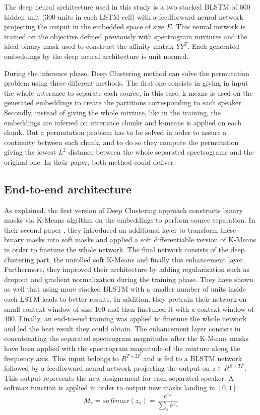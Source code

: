 \documentclass[master,final,11pt]{iscs-thesis}
\begin{document}
The deep neural architecture used in this study is a two stacked BLSTM of 600 hidden unit (300 units in each LSTM cell) with a feedforward neural network projecting the output in the embedded space of size $E$. This neural network is trained on the objective defined previously with spectrogram mixtures and the ideal binary mask used to construct the affinity matrix $YY^T$. Each generated embeddings by the deep neural architecture is unit normed.

During the inference phase, Deep Clustering method can solve the permutation problem using three different methods. The first one consists in giving in input the whole utterance to separate each source, in this case, k-means is used on the generated embeddings to create the partitions corresponding to each speaker. Secondly, instead of giving the whole mixture, like in the training, the embeddings are inferred on utterance chunks and k-means is applied on each chunk. But a permutation problem has to be solved in order to assure a continuity between each chunk, and to do so they compute the permutation giving the lowest $L^2$ distance between the whole separated spectrograms and the original one. In their paper, both method could deliver 
\subsection{End-to-end architecture}

As explained, the first version of Deep Clustering \cite{DPCLV1} approach constructs binary masks via K-Means algrithm on the embeddings to perform source separation. In their second paper \cite{DPCLV2}, they introduced an additional layer to transform these binary masks into soft masks and applied a soft differentiable version of K-Means in order to finetune the whole network. The final network consists of the deep clustering part, the unrolled soft K-Means and finally this enhancement layer.
Furthermore, they improved their architecture by adding regularization such as dropout and gradient normalization during the training phase. They have shown as well that using more stacked BLSTM with a smaller number of units inside each LSTM leads to better results.
In addition, they pretrain their network on small context window of size 100 and then finetuned it with a context window of 400. Finally, an end-to-end training was applied to finetune the whole network and led the best result they could obtain.
The enhancement layer consists in concatenating the separated spectrogram magnitudes after the K-Means masks have been applied with the spectrogram magnitude of the mixture along the frequency axis. This input belongs to $R^{T\times 2F}$ and is fed to a BLSTM network followed by a feedforward neural network projecting the output on $z \in R^{S\times TF}$. This output represents the new assignement for each separated speaker. A softmax function is applied in order to output new masks landing in $[0,1]$:
\[
M_s = softmax(z_s) = \frac{e^{z_s}}{\sum_s{e^{z_s}}} 
\]
\end{document}
